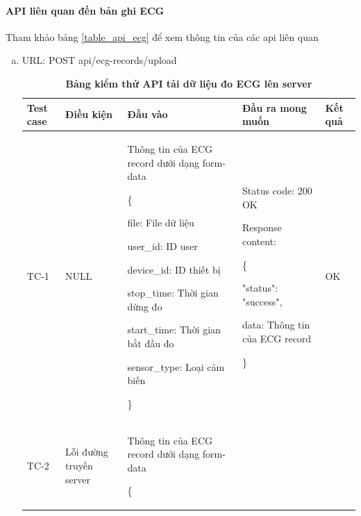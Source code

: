 \paragraph{API liên quan đến bản ghi ECG}
\mbox{}

Tham khảo bảng \ref{table_api_ecg} để xem thông tin của các api liên quan

\begin{enumerate}[a)]
  \item URL: POST api/ecg-records/upload 
  

  \begin{xltabular}{\textwidth}{
    | >{\raggedright\arraybackslash}p{1cm}
    | >{\raggedright\arraybackslash}p{1.5cm}
    | >{\raggedright\arraybackslash}X
    | >{\raggedright\arraybackslash}X
    | >{\raggedright\arraybackslash}p{1cm}|
    }
    \caption{\bfseries \fontsize{12pt}{0pt}\selectfont Bảng kiểm thử API tải dữ liệu đo ECG lên server}
    \\
    \hline
    \bfseries Test case    &\bfseries Điều kiện   &\bfseries Đầu vào 
    &\bfseries Đầu ra mong muốn &\bfseries Kết quả\\ \hline
  
  
    TC-1
    & NULL
    & Thông tin của ECG record dưới dạng form-data

\{

file: File dữ liệu

user\_id: ID user

device\_id: ID thiết bị

stop\_time: Thời gian dừng đo

start\_time: Thời gian bắt đầu đo

sensor\_type: Loại cảm biến


\}

    & 
  
    Status code: 200 OK
  
      Response content:
  
      \{
  
    "status": "success",

    data: Thông tin của ECG record
  
    \}
    
    & OK
  
    \\ \hline
  
    TC-2
    & Lỗi đường truyền server
    & Thông tin của ECG record dưới dạng form-data

\{


\end{xltabular}
\end{enumerate}
